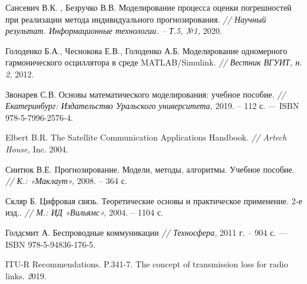 

\begin{thebibliography}{99}
 


\begin{onehalfspace}

	        Сансевич В.К. , Безручко В.В. Моделирование процесса оценки погрешностей при
	        реализации метода индивидуального прогнозирования. \emph{ // Научный результат.
	        	Информационные технологии. – Т.5, №1,}  2020. 

               Голоденко Б.А., Чеснокова Е.В., Голоденко А.Б. Моделирование одномерного гармонического осциллятора в среде MATLAB/Simulink. \emph{ // Вестник ВГУИТ, н. 2,} 2012.

        
         Звонарев С.В. Основы математического моделирования: учебное пособие. \emph{ // Екатеринбург: Издательство Уральского университета,} 2019. –  112 с. — ISBN 978-5-7996-2576-4.

         
	        Elbert B.R. The Satellite Communication Applications Handbook. \emph{ // Artech House,} Inc. 2004.


    Снитюк В.Е. Прогнозирование. Модели, методы, алгоритмы. Учебное пособие. \emph{ // К.: «Маклаут»,} 2008. – 364 с. 

            Скляр Б.  Цифровая связь. Теоретические основы и практическое применение. 2-е изд..
        \emph{ // М.: ИД «Вильямс»,} 2004. – 1104 с.


           Голдсмит А. Беспроводные коммуникации \emph { // Техносфера,}  2011 г. – 904 с. — ISBN 978-5-94836-176-5.

           ITU-R Recommendations. P.341-7. The concept of transmission loss for radio links. \emph 2019. 


\end{onehalfspace}

	\end{thebibliography} 
	